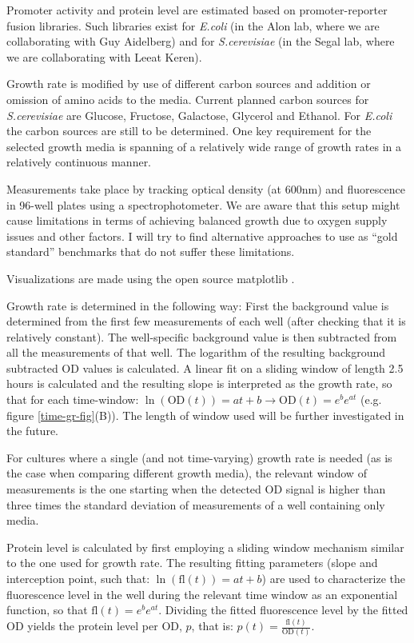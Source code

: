 \documentclass[a4page,notitlepage]{article}
\begin{document}
Promoter activity and protein level are estimated based on promoter-reporter fusion libraries.
Such libraries exist for \emph{E.coli} (in the Alon lab, where we are collaborating with Guy Aidelberg) and for \emph{S.cerevisiae} (in the Segal lab, where we are collaborating with Leeat Keren).

Growth rate is modified by use of different carbon sources and addition or omission of amino acids to the media.
Current planned carbon sources for \emph{S.cerevisiae} are Glucose, Fructose, Galactose, Glycerol and Ethanol.
For \emph{E.coli} the carbon sources are still to be determined.
One key requirement for the selected growth media is spanning of a relatively wide range of growth rates in a relatively continuous manner.

Measurements take place by tracking optical density (at 600nm) and fluorescence in 96-well plates using a spectrophotometer.
We are aware that this setup might cause limitations in terms of achieving balanced growth due to oxygen supply issues and other factors.
I will try to find alternative approaches to use as ``gold standard'' benchmarks that do not suffer these limitations.

Visualizations are made using the open source matplotlib \parencite{Hunter2007}.

Growth rate is determined in the following way:
First the background value is determined from the first few measurements of each well (after checking that it is relatively constant).
The well-specific background value is then subtracted from all the measurements of that well.
The logarithm of the resulting background subtracted OD values is calculated.
A linear fit on a sliding window of length 2.5 hours is calculated and the resulting slope is interpreted as the growth rate, so that for each time-window: $\ln(\text{OD}(t))=at+b\rightarrow\text{OD}(t)=e^be^{at}$ (e.g. figure \ref{time-gr-fig}(B)).
The length of window used will be further investigated in the future.

For cultures where a single (and not time-varying) growth rate is needed (as is the case when comparing different growth media), the relevant window of measurements is the one starting when the detected OD signal is higher than three times the standard deviation of measurements of a well containing only media.

Protein level is calculated by first employing a sliding window mechanism similar to the one used for growth rate.
The resulting fitting parameters (slope and interception point, such that: $\ln(\text{fl}(t))=at+b$) are used to characterize the fluorescence level in the well during the relevant time window as an exponential function, so that $\text{fl}(t)=e^be^{at}$.
Dividing the fitted fluorescence level by the fitted OD yields the protein level per OD, $p$, that is: $p(t)=\frac{\text{fl}(t)}{\text{OD}(t)}$.
\end{document}
